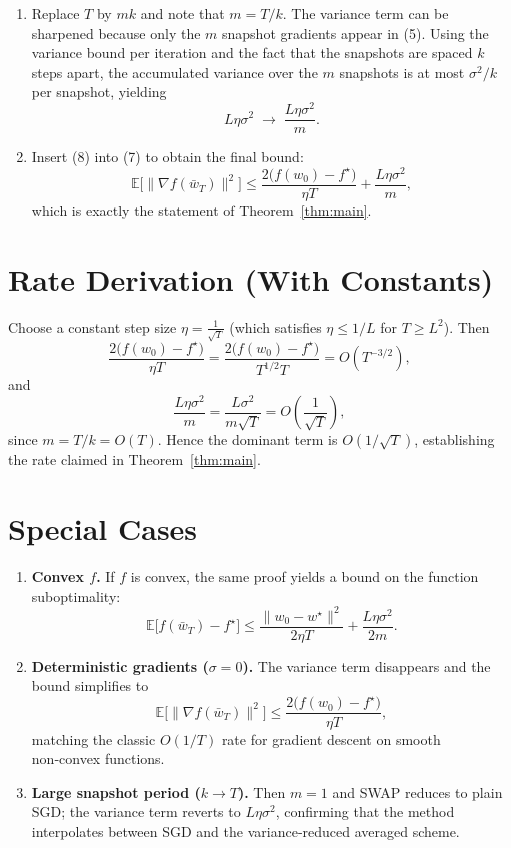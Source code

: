 \documentclass{article}
\newcommand{\E}{\mathbb{E}}
\begin{document}
\begin{enumerate}
\item[Step 8.] Replace $T$ by $mk$ and note that $m=T/k$. The variance term can be sharpened because only the $m$ snapshot gradients appear in (5). Using the variance bound per iteration and the fact that the snapshots are spaced $k$ steps apart, the accumulated variance over the $m$ snapshots is at most $\sigma^2/k$ per snapshot, yielding
\[
    L\eta\sigma^2 \;\longrightarrow\; \frac{L\eta\sigma^2}{m} .
\tag{8}
\]

\item[Step 9.] Insert (8) into (7) to obtain the final bound:
\[
    \E\!\bigl[\|\nabla f(\bar w_T)\|^2\bigr]
    \le \frac{2\bigl(f(w_0)-f^\star\bigr)}{\eta T}
        +\frac{L\eta\sigma^2}{m},
\]
which is exactly the statement of Theorem~\ref{thm:main}. \qedhere
\end{enumerate}

\section*{Rate Derivation (With Constants)}
Choose a constant step size $\eta = \frac{1}{\sqrt{T}}$ (which satisfies $\eta\le 1/L$ for $T\ge L^2$). Then
\[
    \frac{2\bigl(f(w_0)-f^\star\bigr)}{\eta T}
    =\frac{2\bigl(f(w_0)-f^\star\bigr)}{T^{1/2}T}
    =O\!\left(T^{-3/2}\right) ,
\]
and
\[
    \frac{L\eta\sigma^2}{m}
    =\frac{L\sigma^2}{m\sqrt{T}}
    =O\!\left(\frac{1}{\sqrt{T}}\right) ,
\]
since $m=T/k=O(T)$. Hence the dominant term is $O(1/\sqrt{T})$, establishing the rate claimed in Theorem~\ref{thm:main}.

\section*{Special Cases}
\begin{enumerate}[leftmargin=*]
    \item \textbf{Convex $f$.} If $f$ is convex, the same proof yields a bound on the function suboptimality:
    \[
        \E\!\bigl[f(\bar w_T)-f^\star\bigr]\le
        \frac{\|w_0-w^\star\|^2}{2\eta T}
        +\frac{L\eta\sigma^2}{2m}.
    \]
    \item \textbf{Deterministic gradients ($\sigma=0$).} The variance term disappears and the bound simplifies to
    \[
        \E\!\bigl[\|\nabla f(\bar w_T)\|^2\bigr]\le \frac{2\bigl(f(w_0)-f^\star\bigr)}{\eta T},
    \]
    matching the classic $O(1/T)$ rate for gradient descent on smooth non‑convex functions.
    \item \textbf{Large snapshot period ($k\to T$).} Then $m=1$ and SWAP reduces to plain SGD; the variance term reverts to $L\eta\sigma^2$, confirming that the method interpolates between SGD and the variance‑reduced averaged scheme.
\end{enumerate}
\end{document}
